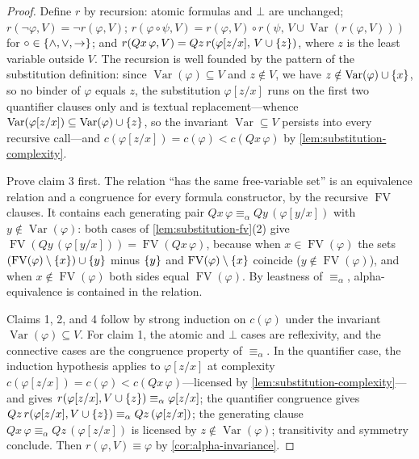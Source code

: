 \documentclass[11pt,oneside,openany]{book}
\theoremstyle{definition}
\theoremstyle{plain}
\theoremstyle{remark}
\DeclarePairedDelimiter{\set}{\lbrace}{\rbrace}
\newcommand{\FV}{\operatorname{FV}}
\newcommand{\bottom}{\bot}
\begin{document}
\begin{proof}
Define \(r\) by recursion: atomic formulas and \(\bottom\) are unchanged;
\(r(\neg\varphi,V)=\neg r(\varphi,V)\);
\(r(\varphi\circ\psi,V)=r(\varphi,V)\circ
r(\psi,\,V\cup\operatorname{Var}(r(\varphi,V)))\) for
\(\circ\in\set{\land,\lor,\to}\); and
\(r(Qx\,\varphi,V)=Qz\,r(\varphi[z/x],\,V\cup\set{z})\), where \(z\) is
the least variable outside \(V\).  The recursion is well founded by the
pattern of the substitution definition: since
\(\operatorname{Var}(\varphi)\subseteq V\) and \(z\notin V\), we have
\(z\notin\operatorname{Var}(\varphi)\cup\set{x}\), so no binder of
\(\varphi\) equals \(z\), the substitution \(\varphi[z/x]\) runs on the
first two quantifier clauses only and is textual replacement---whence
\(\operatorname{Var}(\varphi[z/x])\subseteq
\operatorname{Var}(\varphi)\cup\set{z}\), so the invariant
\(\operatorname{Var}\subseteq V\) persists into every recursive
call---and \(c(\varphi[z/x])=c(\varphi)<c(Qx\,\varphi)\) by
\cref{lem:substitution-complexity}.

Prove claim 3 first.  The relation ``has the same free-variable set''
is an equivalence relation and a congruence for every formula
constructor, by the recursive \(\FV\) clauses.  It contains each
generating pair \(Qx\,\varphi\equiv_\alpha Qy\,(\varphi[y/x])\) with
\(y\notin\operatorname{Var}(\varphi)\): both cases of
\cref{lem:substitution-fv}(2) give
\(\FV(Qy\,(\varphi[y/x]))=\FV(Qx\,\varphi)\), because when
\(x\in\FV(\varphi)\) the sets
\((\FV(\varphi)\setminus\set{x})\cup\set{y}\) minus \(\set{y}\) and
\(\FV(\varphi)\setminus\set{x}\) coincide (\(y\notin\FV(\varphi)\)), and
when \(x\notin\FV(\varphi)\) both sides equal \(\FV(\varphi)\).  By
leastness of \(\equiv_\alpha\), alpha-equivalence is contained in the
relation.

Claims 1, 2, and 4 follow by strong induction on \(c(\varphi)\) under the
invariant \(\operatorname{Var}(\varphi)\subseteq V\).  For claim 1, the
atomic and \(\bottom\) cases are reflexivity, and the connective cases
are the congruence property of \(\equiv_\alpha\).  In the quantifier
case, the induction hypothesis applies to \(\varphi[z/x]\) at complexity
\(c(\varphi[z/x])=c(\varphi)<c(Qx\,\varphi)\)---licensed by
\cref{lem:substitution-complexity}---and gives
\(r(\varphi[z/x],V\cup\set{z})\equiv_\alpha\varphi[z/x]\); the quantifier
congruence gives
\(Qz\,r(\varphi[z/x],V\cup\set{z})\equiv_\alpha Qz\,(\varphi[z/x])\); the
generating clause \(Qx\,\varphi\equiv_\alpha Qz\,(\varphi[z/x])\) is
licensed by \(z\notin\operatorname{Var}(\varphi)\); transitivity and
symmetry conclude.  Then \(r(\varphi,V)\equiv\varphi\) by
\cref{cor:alpha-invariance}.


\end{proof}
\end{document}
